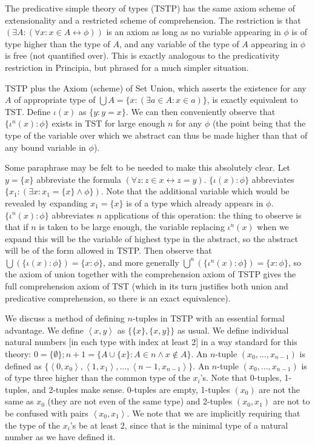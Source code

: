 \documentclass[12pt]{article}
\begin{document}
The predicative simple theory of types (TSTP) has the same axiom scheme of extensionality and a restricted scheme of comprehension.  The restriction is that $(\exists A:(\forall x:x\in A\leftrightarrow \phi))$ is an axiom as long as no variable
appearing in $\phi$ is of type higher than the type of $A$, and any variable of the type of $A$ appearing in $\phi$ is free (not quantified over).   This is exactly analogous to the predicativity restriction in Principia, but phrased for a much simpler situation.

TSTP plus the Axiom (scheme) of Set Union, which asserts the existence for any $A$ of appropriate type of $\bigcup A = \{x:(\exists a \in A:x \in a)\}$, is exactly equivalent to TST.  Define $\iota(x)$ as $\{y:y=x\}$.  We can then conveniently
observe that $\{\iota^n(x):\phi\}$ exists in TST for large enough $n$ for any $\phi$ (the point being that the type of the variable over which we abstract can thus be made higher than that of any bound variable in $\phi$).

Some paraphrase may be felt to be needed to make this absolutely clear.  Let $y=\{x\}$ abbreviate the formula
$(\forall z:z\in x \leftrightarrow z=y)$.  $\{\iota(x):\phi\}$ abbreviates $\{x_1:(\exists x:x_1 = \{x\} \wedge \phi\})$.  Note that the additional variable which would be revealed by expanding $x_1 = \{x\}$ is of a type which already appears in $\phi$.
$\{\iota^n(x):\phi\}$ abbreviates $n$ applications of this operation:  the thing to observe is that if $n$ is taken to be large enough, the variable replacing $\iota^n(x)$ when we expand this will be the variable of highest type in the abstract, so the abstract will be of the form allowed in TSTP.  Then observe that $\bigcup(\{\iota(x):\phi\}) = \{x:\phi\}$, and more generally
$\bigcup^n(\{\iota^n(x):\phi\}) = \{x:\phi\}$, so the axiom of union together with the comprehension axiom of TSTP
gives the full comprehension axiom of TST (which in its turn justifies both union and predicative comprehension, so there is an exact equivalence).

We discuss a method of defining $n$-tuples in TSTP with an essential formal advantage.  We define $\left<x,y\right>$ as
$\{\{x\},\{x,y\}\}$ as usual.  We define individual natural numbers [in each type with index at least 2]  in a way standard for this theory:  $0 = \{\emptyset\}; n+1 = \{A \cup \{x\}:A \in n \wedge x \not\in A\}$.  An $n$-tuple $(x_0,\ldots,x_{n-1})$ is defined as $\{\left<0,x_0\right>,\left<1,x_1\right>,\ldots,\left<{n-1},x_{n-1}\right>\}$.  An $n$-tuple $(x_0,\ldots,x_{n-1})$ is of type three higher than the common type of the $x_i$'s.  Note that 0-tuples, 1-tuples, and 2-tuples make sense.  0-tuples are empty, 1-tuples $(x_0)$ are not the same as $x_0$ (they are not even of the same type) and 2-tuples $(x_0,x_1)$ are not to be confused with pairs $\left<x_0,x_1\right>$.  We note that we are implicitly requiring that the type of the $x_i$'s be at least 2, since that is the minimal type of a natural number as we have defined it.
\end{document}
